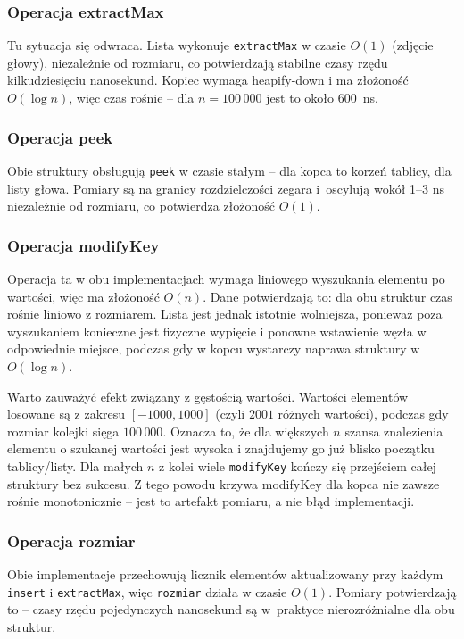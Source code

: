 \subsubsection{Operacja extractMax}

Tu sytuacja się odwraca. Lista wykonuje \texttt{extractMax} w czasie $O(1)$
(zdjęcie głowy), niezależnie od rozmiaru, co potwierdzają stabilne czasy
rzędu kilkudziesięciu nanosekund. Kopiec wymaga heapify-down i ma złożoność
$O(\log n)$, więc czas rośnie -- dla $n = 100\,000$ jest to około
\SI{600}{\nano\second}.

\subsubsection{Operacja peek}

Obie struktury obsługują \texttt{peek} w czasie stałym -- dla kopca to korzeń
tablicy, dla listy głowa. Pomiary są na granicy rozdzielczości zegara
i~oscylują wokół 1--3 ns niezależnie od rozmiaru, co potwierdza złożoność
$O(1)$.

\subsubsection{Operacja modifyKey}

Operacja ta w obu implementacjach wymaga liniowego wyszukania elementu po
wartości, więc ma złożoność $O(n)$. Dane potwierdzają to: dla obu struktur
czas rośnie liniowo z rozmiarem. Lista jest jednak istotnie wolniejsza,
ponieważ poza wyszukaniem konieczne jest fizyczne wypięcie i ponowne
wstawienie węzła w odpowiednie miejsce, podczas gdy w kopcu wystarczy
naprawa struktury w $O(\log n)$.

Warto zauważyć efekt związany z gęstością wartości. Wartości elementów
losowane są z zakresu $[-1000, 1000]$ (czyli $2001$ różnych wartości),
podczas gdy rozmiar kolejki sięga $100\,000$. Oznacza to, że dla większych
$n$ szansa znalezienia elementu o szukanej wartości jest wysoka i znajdujemy
go już blisko początku tablicy/listy. Dla małych $n$ z kolei wiele
\texttt{modifyKey} kończy się przejściem całej struktury bez sukcesu. Z tego
powodu krzywa modifyKey dla kopca nie zawsze rośnie monotonicznie -- jest to
artefakt pomiaru, a nie błąd implementacji.

\subsubsection{Operacja rozmiar}

Obie implementacje przechowują licznik elementów aktualizowany przy każdym
\texttt{insert} i \texttt{extractMax}, więc \texttt{rozmiar} działa w czasie
$O(1)$. Pomiary potwierdzają to -- czasy rzędu pojedynczych nanosekund są
w~praktyce nierozróżnialne dla obu struktur.

